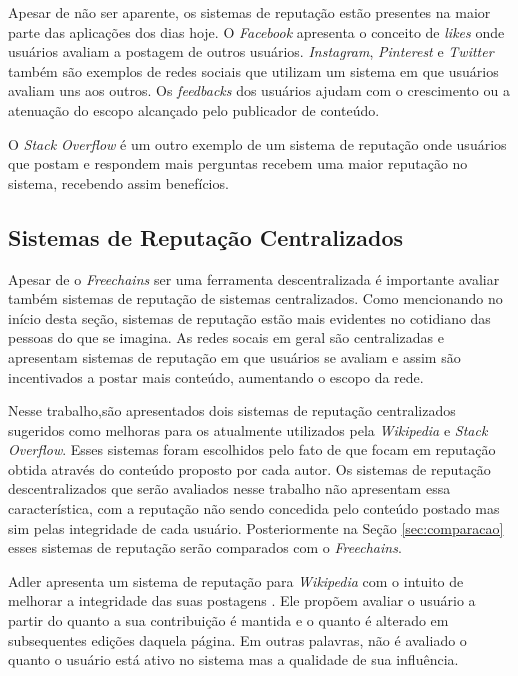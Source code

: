 \documentclass[12pt]{article}
\newcommand{\FC} {\emph{Freechains}\xspace}
\begin{document}
Apesar de não ser aparente, os sistemas de reputação estão presentes na maior parte das aplicações dos dias hoje. O \emph{Facebook} apresenta o conceito de \emph{likes} onde usuários avaliam a postagem de outros usuários. \emph{Instagram}, \emph{Pinterest} e \emph{Twitter} também são exemplos de redes sociais que utilizam um sistema em que usuários avaliam uns aos outros. Os \emph{feedbacks} dos usuários ajudam com o crescimento ou a atenuação do escopo alcançado pelo publicador de conteúdo.  

O \emph{Stack Overflow} é um outro exemplo de um sistema de reputação onde usuários que postam e respondem mais perguntas recebem uma maior reputação no sistema, recebendo assim benefícios.

\subsection{Sistemas de Reputação Centralizados} \label{subsec:SRCentra}

Apesar de o \FC ser uma ferramenta descentralizada é importante avaliar também sistemas de reputação de sistemas centralizados. Como mencionando no início desta seção, sistemas de reputação estão mais evidentes no cotidiano das pessoas do que se imagina. As redes socais em geral são centralizadas e apresentam sistemas de reputação em que usuários se avaliam e assim são incentivados a postar mais conteúdo, aumentando o escopo da rede.

Nesse trabalho,são apresentados dois sistemas de reputação centralizados sugeridos como melhoras para os atualmente utilizados pela \emph{Wikipedia} e \emph{Stack Overflow}. Esses sistemas foram escolhidos pelo fato de que focam em reputação obtida através do conteúdo proposto por cada autor. Os sistemas de reputação descentralizados que serão avaliados nesse trabalho não apresentam essa característica, com a reputação não sendo concedida pelo conteúdo postado mas sim pelas integridade de cada usuário. Posteriormente na Seção \ref{sec:comparacao} esses sistemas de reputação serão comparados com o \FC. 

Adler apresenta um sistema de reputação para \emph{Wikipedia} com o intuito de melhorar a integridade das suas postagens \cite{adler2007content}. Ele propõem avaliar o usuário a partir do quanto a sua contribuição é mantida e o quanto é alterado em subsequentes edições daquela página. Em outras palavras, não é avaliado o quanto o usuário está ativo no sistema mas a qualidade de sua influência. 
\end{document}
